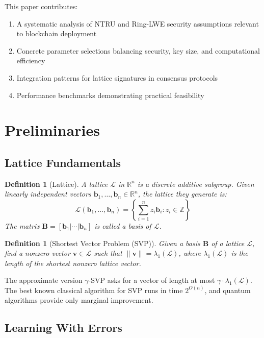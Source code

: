 \documentclass[11pt,a4paper]{article}
\newtheorem{definition}[theorem]{Definition}
\begin{document}
This paper contributes:
\begin{enumerate}[noitemsep]
    \item A systematic analysis of NTRU and Ring-LWE security assumptions relevant to blockchain deployment
    \item Concrete parameter selections balancing security, key size, and computational efficiency
    \item Integration patterns for lattice signatures in consensus protocols
    \item Performance benchmarks demonstrating practical feasibility
\end{enumerate}

\section{Preliminaries}

\subsection{Lattice Fundamentals}

\begin{definition}[Lattice]
A lattice $\mathcal{L}$ in $\mathbb{R}^n$ is a discrete additive subgroup. Given linearly independent vectors $\mathbf{b}_1, \ldots, \mathbf{b}_n \in \mathbb{R}^n$, the lattice they generate is:
\[
\mathcal{L}(\mathbf{b}_1, \ldots, \mathbf{b}_n) = \left\{ \sum_{i=1}^{n} z_i \mathbf{b}_i : z_i \in \mathbb{Z} \right\}
\]
The matrix $\mathbf{B} = [\mathbf{b}_1 | \cdots | \mathbf{b}_n]$ is called a basis of $\mathcal{L}$.
\end{definition}

\begin{definition}[Shortest Vector Problem (SVP)]
Given a basis $\mathbf{B}$ of a lattice $\mathcal{L}$, find a nonzero vector $\mathbf{v} \in \mathcal{L}$ such that $\|\mathbf{v}\| = \lambda_1(\mathcal{L})$, where $\lambda_1(\mathcal{L})$ is the length of the shortest nonzero lattice vector.
\end{definition}

The approximate version $\gamma$-SVP asks for a vector of length at most $\gamma \cdot \lambda_1(\mathcal{L})$. The best known classical algorithm for SVP runs in time $2^{O(n)}$, and quantum algorithms provide only marginal improvement.

\subsection{Learning With Errors}
\end{document}

